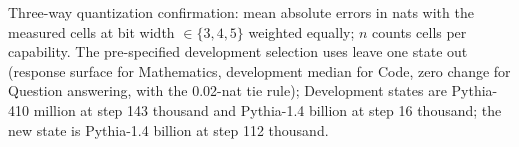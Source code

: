 \begin{table}[tb]
\par\smallskip\begin{minipage}{\linewidth}\footnotesize Three-way quantization confirmation: mean absolute errors in nats with the measured cells at bit width $\in\{3,4,5\}$ weighted equally; $n$ counts cells per capability. The pre-specified development selection uses leave one state out (response surface for Mathematics, development median for Code, zero change for Question answering, with the 0.02-nat tie rule); Development states are Pythia-410 million at step 143 thousand and Pythia-1.4 billion at step 16 thousand; the new state is Pythia-1.4 billion at step 112 thousand.\end{minipage}
\end{table}
